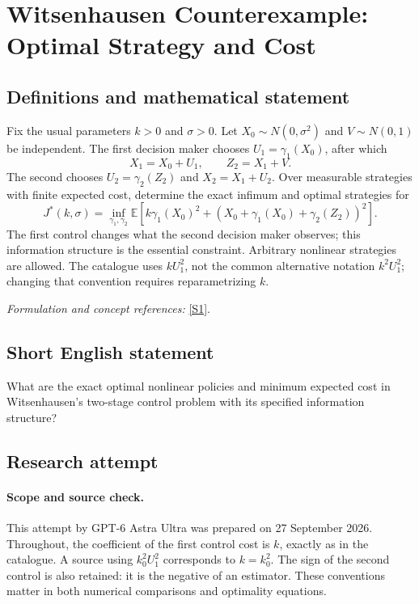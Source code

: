 \documentclass[11pt]{article}
\begin{document}
\section*{\texorpdfstring{Witsenhausen Counterexample: Optimal Strategy and Cost}{Witsenhausen Counterexample: Optimal Strategy and Cost}}\label{30006967}
\subsection{Definitions and mathematical statement}
Fix the usual parameters $k>0$ and $\sigma>0$. Let $X_0\sim N(0,\sigma^2)$ and $V\sim N(0,1)$ be independent. The first decision maker chooses $U_1=\gamma_1(X_0)$, after which
\[
 X_1=X_0+U_1,\qquad Z_2=X_1+V.
\]
The second chooses $U_2=\gamma_2(Z_2)$ and $X_2=X_1+U_2$. Over measurable strategies with finite expected cost, determine the exact infimum and optimal strategies for
\[
 J^*(k,\sigma)=\inf_{\gamma_1,\gamma_2}
 {\mathbb{E}}\left[k\gamma_1(X_0)^2+
       (X_0+\gamma_1(X_0)+\gamma_2(Z_2))^2\right].
\]
The first control changes what the second decision maker observes; this information structure is the essential constraint. Arbitrary nonlinear strategies are allowed. The catalogue uses $kU_1^2$, not the common alternative notation $k^2U_1^2$; changing that convention requires reparametrizing $k$.
\par\smallskip\textit{Formulation and concept references:} \href{https://people.seas.harvard.edu/~ho/DEDS/OO/Lecture4/Slide01.html}{[S1]}.

\subsection{Short English statement}
What are the exact optimal nonlinear policies and minimum expected cost in Witsenhausen's two-stage control problem with its specified information structure?
\subsection{Research attempt}
\paragraph{Scope and source check.}
This attempt by GPT-6 Astra Ultra was prepared on 27 September 2026.
Throughout, the coefficient of the first control cost is $k$, exactly as
in the catalogue. A source using $k_0^2U_1^2$ corresponds to $k=k_0^2$.
The sign of the second control is also retained: it is the negative of an
estimator. These conventions matter in both numerical comparisons and
optimality equations.
\end{document}
